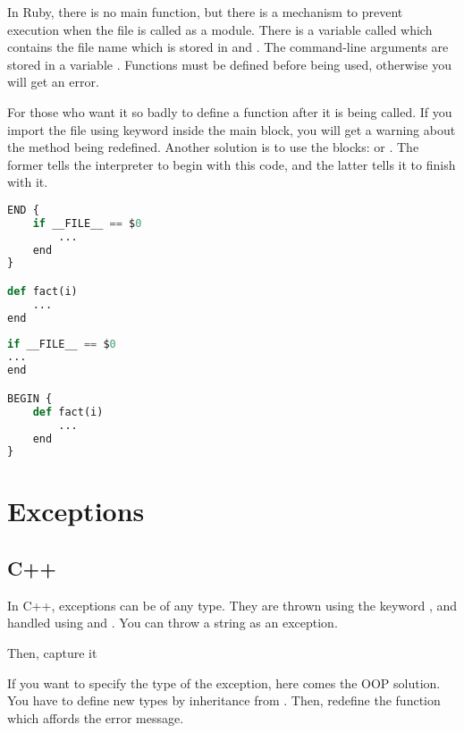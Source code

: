 \documentclass{KodeBook}
\begin{document}
In Ruby, there is no main function, but there is a mechanism to prevent execution when the file is called as a module. 
There is a variable called  which contains the file name which is stored in  and . 
The command-line arguments are stored in a variable .
Functions must be defined before being used, otherwise you will get an error.



For those who want it so badly to define a function after it is being called.
If you import the file using  keyword inside the main block, you will get a warning about the method being redefined. 
Another solution is to use the blocks:  or . 
The former tells the interpreter to begin with this code, and the latter tells it to finish with it.

\begin{lstlisting}[language=Python, style=codeStyle]
END {
	if __FILE__ == $0
		...
	end
}

def fact(i)
	...
end
\end{lstlisting}

\begin{lstlisting}[language=Python, style=codeStyle]
if __FILE__ == $0
...
end

BEGIN {
	def fact(i)
		...
	end
}
\end{lstlisting}


\section{Exceptions}

\subsection{C++}

In C++, exceptions can be of any type. 
They are thrown using the keyword , and handled using  and .
You can throw a string as an exception.



Then, capture it




If you want to specify the type of the exception, here comes the OOP solution. 
You have to define new types by inheritance from . 
Then, redefine the function  which affords the error message.
\end{document}
